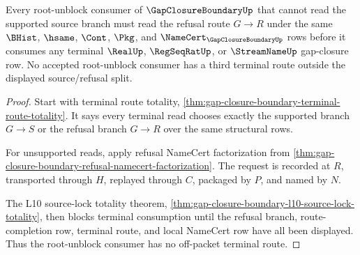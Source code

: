 \begin{theorem}
\label{thm:gapclosureboundary-terminal-refusal-consumer-totality}
Every root-unblock consumer of $\GapClosureBoundaryUp$ that cannot read the supported source branch must read the refusal route $G \longrightarrow R$ under the same $\BHist$, $\hsame$, $\Cont$, $\Pkg$, and $\NameCert_{\GapClosureBoundaryUp}$ rows before it consumes any terminal $\RealUp$, $\RegSeqRatUp$, or $\StreamNameUp$ gap-closure row. No accepted root-unblock consumer has a third terminal route outside the displayed source/refusal split.
\end{theorem}
\begin{proof}
Start with terminal route totality, \autoref{thm:gap-closure-boundary-terminal-route-totality}. It says every terminal read chooses exactly the supported branch $G \longrightarrow S$ or the refusal branch $G \longrightarrow R$ over the same structural rows.

For unsupported reads, apply refusal NameCert factorization from \autoref{thm:gap-closure-boundary-refusal-namecert-factorization}. The request is recorded at $R$, transported through $H$, replayed through $C$, packaged by $P$, and named by $N$.

The L10 source-lock totality theorem, \autoref{thm:gap-closure-boundary-l10-source-lock-totality}, then blocks terminal consumption until the refusal branch, route-completion row, terminal route, and local NameCert row have all been displayed. Thus the root-unblock consumer has no off-packet terminal route.
\end{proof}

